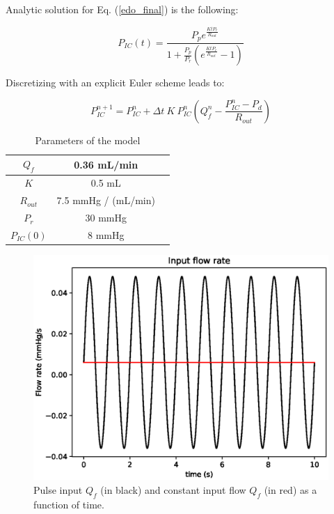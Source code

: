 \documentclass{config}
\begin{document}
Analytic solution for Eq. (\ref{edo_final}) is the following:

\begin{equation}\label{sol_analytic}
P_{IC}(t) = \frac{P_p e^{\frac{K t P_r}{R_{out}}}}{1 + \frac{P_p}{P_r}\left(e^{\frac{K t P_r}{R_{out}}} - 1 \right) }
\end{equation}

Discretizing with an explicit Euler scheme leads to:

\begin{equation}\label{Euler_explicit}
P_{IC} ^{n+1} = P_{IC} ^n  + \Delta t  ~ K ~ P_{IC}^n \left(Q_f^n - \frac{P_{IC}^n - P_d}{R_{out}}\right)
\end{equation}


\begin{table}[H]
\begin{center}
\begin{tabular}{|c|c|c|}
\hline 
$Q_f$ & 0.36 mL/min \\
\hline 
$K$ & 0.5 mL \\
\hline 
$R_{out}$ & 7.5 mmHg / (mL/min) \\ 
\hline 
$P_r$ & 30 mmHg \\ 
\hline 
$P_{IC}(0)$ & 8 mmHg \\ 
\hline
\end{tabular} 
\caption{Parameters of the model}
\label{parameters}
\end{center}
\end{table}

\begin{figure}[H]
\centering
\includegraphics[scale=0.55]{flow.eps}
\caption{Pulse input $Q_f$ (in black) and constant input flow $Q_f$ (in red) as a function of time.}
\label{input_flow}
\end{figure}
\end{document}
